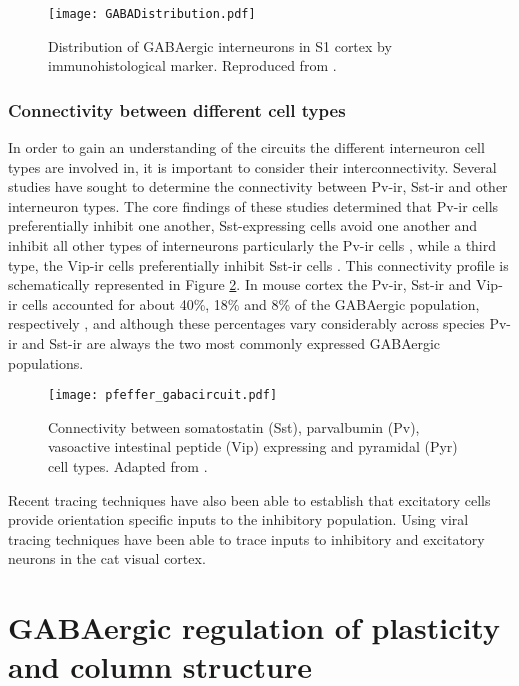 \begin{figure}
	\centering
        \texttt{[image: GABADistribution.pdf]}
	\caption{Distribution of GABAergic interneurons in S1 cortex by
      immunohistological marker. Reproduced from \cite{Rudy2011}.}
	\label{GABADistribution}
\end{figure}

\subsubsection{Connectivity between different cell types}

In order to gain an understanding of the circuits the different
interneuron cell types are involved in, it is important to consider
their interconnectivity. Several studies have sought to determine the
connectivity between Pv-ir, Sst-ir and other interneuron types. The
core findings of these studies determined that Pv-ir cells
preferentially inhibit one another, Sst-expressing cells avoid one
another and inhibit all other types of interneurons particularly the
Pv-ir cells \citep{Xu2013}, while a third type, the Vip-ir cells
preferentially inhibit Sst-ir cells \citep{Pfeffer2013}. This
connectivity profile is schematically represented in Figure
\ref{gaba_circuit}. In mouse cortex the Pv-ir, Sst-ir and Vip-ir cells
accounted for about 40\%, 18\% and 8\% of the GABAergic population,
respectively \citep{Xu2010}, and although these percentages vary
considerably across species Pv-ir and Sst-ir are always the two most
commonly expressed GABAergic populations.

\begin{figure}
	\centering
        \texttt{[image: pfeffer\_gabacircuit.pdf]}
	\caption{Connectivity between somatostatin (Sst),
        parvalbumin (Pv), vasoactive intestinal peptide (Vip)
        expressing and pyramidal (Pyr) cell types. Adapted from
        \cite{Pfeffer2013}.}
	\label{gaba_circuit}
\end{figure}

Recent tracing techniques have also been able to establish that
excitatory cells provide orientation specific inputs to the inhibitory
population. Using viral tracing techniques \cite{Liu2013} have been able to
trace inputs to inhibitory and excitatory neurons in the cat visual
cortex.

\section{GABAergic regulation of plasticity and column structure}

